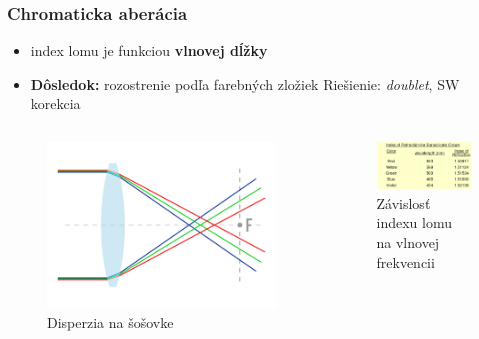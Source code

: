 \documentclass[10pt,xcolor=pdflatex]{beamer}
\begin{document}
\begin{frame}\frametitle{Chromaticka aberácia}
    \begin{itemize}
        \item index lomu je funkciou \textbf{vlnovej dĺžky}
        \item \textbf{Dôsledok:} rozostrenie podľa farebných zložiek
        Riešienie: \textit{doublet}, SW korekcia 
    \end{itemize}

    \begin{columns}
    \begin{figure}
        \includegraphics[scale=0.3]{img/chromaticFocus.jpg}
        \caption{Disperzia na šošovke}
    \end{figure}

    \begin{figure}
        \includegraphics[scale=0.4]{img/chromaticRefraction.png}
        \caption{Závislosť indexu lomu na vlnovej frekvencii}
    \end{figure}
    \end{columns}
\end{frame}
\end{document}
